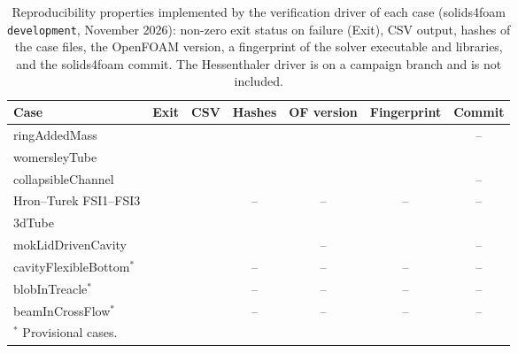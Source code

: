 \begin{table}[htbp]
	\centering
	\footnotesize
	\setlength{\tabcolsep}{4pt}
	\caption{Reproducibility properties implemented by the verification driver of each case (solids4foam \texttt{development}, November 2026): non-zero exit status on failure (Exit), CSV output, hashes of the case files, the OpenFOAM version, a fingerprint of the solver executable and libraries, and the solids4foam commit. The Hessenthaler driver is on a campaign branch and is not included.}
	\label{tab:driver_properties}
	\begin{tabular}{lcccccc}
		\toprule
		Case & Exit & CSV & Hashes & OF version & Fingerprint & Commit \\
		\midrule
		ringAddedMass & \checkmark & \checkmark & \checkmark & \checkmark & \checkmark & -- \\
		womersleyTube & \checkmark & \checkmark & \checkmark & \checkmark & \checkmark & \checkmark \\
		collapsibleChannel & \checkmark & \checkmark & \checkmark & \checkmark & \checkmark & -- \\
		Hron--Turek FSI1--FSI3 & \checkmark & \checkmark & -- & -- & -- & -- \\
		3dTube & \checkmark & \checkmark & \checkmark & \checkmark & \checkmark & \checkmark \\
		mokLidDrivenCavity & \checkmark & \checkmark & \checkmark & -- & \checkmark & -- \\
		cavityFlexibleBottom$^\ast$ & \checkmark & \checkmark & -- & -- & -- & -- \\
		blobInTreacle$^\ast$ & \checkmark & \checkmark & -- & -- & -- & -- \\
		beamInCrossFlow$^\ast$ & \checkmark & \checkmark & -- & -- & -- & -- \\
		\bottomrule
		\multicolumn{7}{l}{$^\ast$ Provisional cases.}
	\end{tabular}
\end{table}
